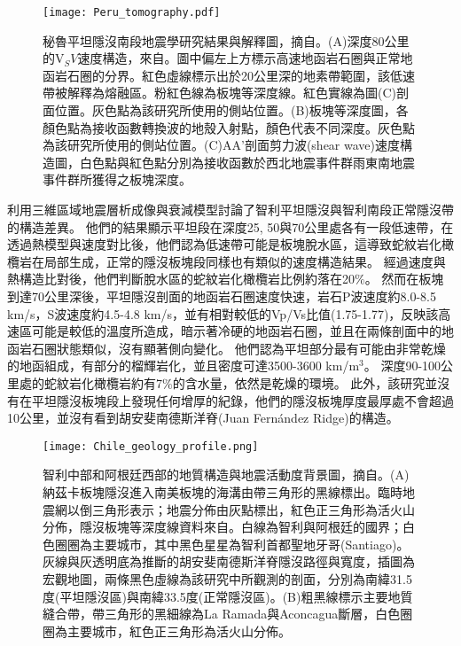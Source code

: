 \begin{figure*}[h]
    \centering
    \texttt{[image: Peru\_tomography.pdf]}
    \caption[秘魯平坦隱沒南段地震學研究結果與解釋圖]{秘魯平坦隱沒南段地震學研究結果與解釋圖，摘自\citealp{Ma2015}。(A)深度80公里的V$_SV$速度構造，來自\citealp{Ma2014}。圖中偏左上方標示高速地函岩石圈與正常地函岩石圈的分界。紅色虛線標示出於20公里深的地素帶範圍，該低速帶被解釋為熔融區。粉紅色線為板塊等深度線。紅色實線為圖(C)剖面位置。灰色點為該研究所使用的側站位置。(B)板塊等深度圖，各顏色點為接收函數轉換波的地殼入射點，顏色代表不同深度。灰色點為該研究所使用的側站位置。(C)AA'剖面剪力波(shear wave)速度構造圖，白色點與紅色點分別為接收函數於西北地震事件群雨東南地震事件群所獲得之板塊深度。
    }
    \label{fig::Peru_tomography}
\end{figure*}

\citealp{Marot2014}利用三維區域地震層析成像與衰減模型討論了智利平坦隱沒與智利南段正常隱沒帶的構造差異。
他們的結果顯示平坦段在深度25, 50與70公里處各有一段低速帶，在透過熱模型與速度對比後，他們認為低速帶可能是板塊脫水區，這導致蛇紋岩化橄欖岩在局部生成，正常的隱沒板塊段同樣也有類似的速度構造結果。
經過速度與熱構造比對後，他們判斷脫水區的蛇紋岩化橄欖岩比例約落在20$\%$。
然而在板塊到達70公里深後，平坦隱沒剖面的地函岩石圈速度快速，岩石P波速度約8.0-8.5 km/s，S波速度約4.5-4.8 km/s，並有相對較低的Vp/Vs比值(1.75-1.77)，反映該高速區可能是較低的溫度所造成，暗示著冷硬的地函岩石圈，並且在兩條剖面中的地函岩石圈狀態類似，沒有顯著側向變化。
他們認為平坦部分最有可能由非常乾燥的地函組成，有部分的榴輝岩化，並且密度可達3500-3600 km/m$^3$。
深度90-100公里處的蛇紋岩化橄欖岩約有7$\%$的含水量，依然是乾燥的環境。
此外，該研究並沒有在平坦隱沒板塊段上發現任何增厚的紀錄，他們的隱沒板塊厚度最厚處不會超過10公里，並沒有看到胡安斐南德斯洋脊(Juan Fernández Ridge)的構造。

\begin{figure*}[h]
    \centering
    \texttt{[image: Chile\_geology\_profile.png]}
    \caption[智利中部和阿根廷西部的地質構造與地震活動度背景圖]{智利中部和阿根廷西部的地質構造與地震活動度背景圖，摘自\citealp{Marot2014}。(A)納茲卡板塊隱沒進入南美板塊的海溝由帶三角形的黑線標出。臨時地震網以倒三角形表示；地震分佈由灰點標出，紅色正三角形為活火山分佈，隱沒板塊等深度線資料來自\citealp{anderson2007geometry}。白線為智利與阿根廷的國界；白色圈圈為主要城市，其中黑色星星為智利首都聖地牙哥(Santiago)。灰線與灰透明底為推斷的胡安斐南德斯洋脊隱沒路徑與寬度，插圖為宏觀地圖，兩條黑色虛線為該研究中所觀測的剖面，分別為南緯31.5度(平坦隱沒區)與南緯33.5度(正常隱沒區)。(B)粗黑線標示主要地質縫合帶，帶三角形的黑細線為La Ramada與Aconcagua斷層，白色圈圈為主要城市，紅色正三角形為活火山分佈。
    }
    \label{fig::Chile_geology_profile}
\end{figure*}

